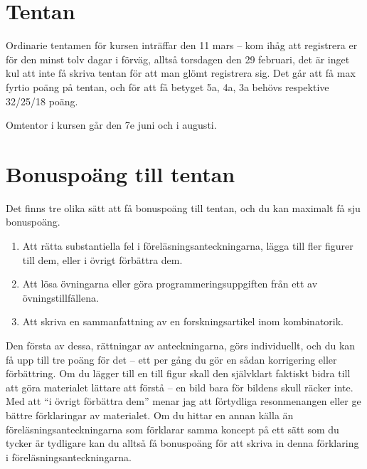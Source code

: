 \documentclass[nobib]{tufte-handout}
\begin{document}
\section{Tentan}

Ordinarie tentamen för kursen inträffar den 11 mars -- kom ihåg att registrera er för den minst tolv dagar i förväg, alltså torsdagen den 29 februari, det är inget kul att inte få skriva tentan för att man glömt registrera sig. Det går att få max fyrtio poäng på tentan, och för att få betyget 5a, 4a, 3a behövs respektive 32/25/18 poäng.

Omtentor i kursen går den 7e juni och i augusti.

\section{Bonuspoäng till tentan}

Det finns tre olika sätt att få bonuspoäng till tentan, och du kan maximalt få sju bonuspoäng.

\begin{enumerate}
	\item Att rätta substantiella fel i föreläsningsanteckningarna, lägga till fler figurer till dem, eller i övrigt förbättra dem.
	\item Att lösa övningarna eller göra programmeringsuppgiften från ett av övningstillfällena.
	\item Att skriva en sammanfattning av en forskningsartikel inom kombinatorik.
\end{enumerate}

Den första av dessa, rättningar av anteckningarna, görs individuellt, och du kan få upp till tre poäng för det -- ett per gång du gör en sådan korrigering eller förbättring. Om du lägger till en till figur skall den självklart faktiskt bidra till att göra materialet lättare att förstå -- en bild bara för bildens skull räcker inte. Med att ``i övrigt förbättra dem'' menar jag att förtydliga resonmenangen eller ge bättre förklaringar av materialet. Om du hittar en annan källa än föreläsningsanteckningarna som förklarar samma koncept på ett sätt som du tycker är tydligare kan du alltså få bonuspoäng för att skriva in denna förklaring i föreläsningsanteckningarna.
\end{document}
